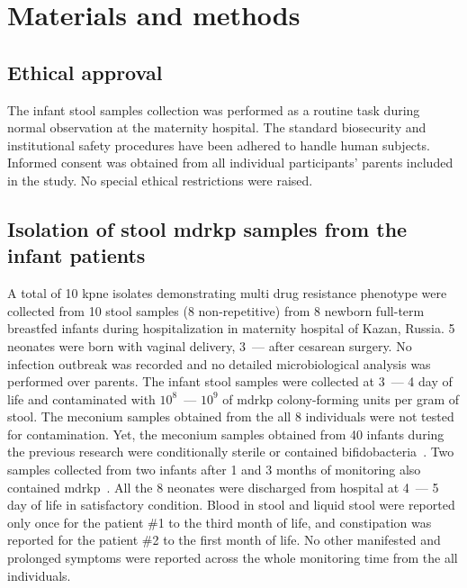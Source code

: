 \section{Materials and methods}\label{sec:mat_met}
\subsection{Ethical approval}\label{subsec:eth}
The infant stool samples collection was performed as a routine task during normal observation at the
maternity hospital.
The standard biosecurity and institutional safety procedures have been adhered to handle human
subjects.
Informed consent was obtained from all individual participants’ parents included in the study.
No special ethical restrictions were raised.

\subsection{Isolation of stool \gls{mdrkp} samples from the infant patients}\label{subsec:iso}
A total of 10 \gls{kpne} isolates demonstrating multi drug resistance phenotype were collected from
10 stool samples (8 non-repetitive) from 8 newborn full-term breastfed infants during hospitalization in
maternity hospital of Kazan, Russia.
5 neonates were born with vaginal delivery, 3~--- after cesarean surgery.
No infection outbreak was recorded and no detailed microbiological analysis was performed over parents.
The infant stool samples were collected at 3~--- 4 day of life and contaminated with $10^8$~--- $10^9$ of \gls{mdrkp}
colony-forming units per gram of stool.
The meconium samples obtained from the all 8 individuals were not tested for contamination.
Yet, the meconium samples obtained from 40 infants during the previous research were conditionally sterile or
contained bifidobacteria~\cite{Nikolaeva2019a}.
Two samples collected from two infants after 1 and 3 months of monitoring also contained \gls{mdrkp}~.
All the 8 neonates were discharged from hospital at 4~--- 5 day of life in satisfactory condition.
Blood in stool and liquid stool were reported only once for the patient \#1 to the third month of life,
and constipation was reported for the patient \#2 to the first month of life.
No other manifested and prolonged symptoms were reported across the whole monitoring time from the all individuals.

